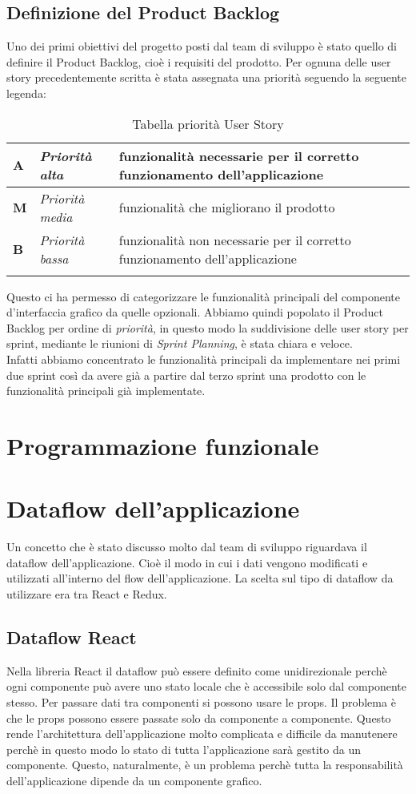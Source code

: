 \subsection{Definizione del Product Backlog}
Uno dei primi obiettivi del progetto posti dal team di sviluppo è stato quello di definire il Product Backlog, cioè i requisiti del prodotto. Per ognuna delle user story precedentemente scritta è stata assegnata una priorità seguendo la seguente legenda:
\begin{longtable} {
		|>{\centering}p{10mm}| 
		|>{}p{25mm}|
		|>{}p{85mm}|
		>{}p{0mm}}
	\hline
	\textbf{A} & \textit{Priorità alta}  & funzionalità necessarie per il corretto funzionamento dell'applicazione \\ \hline
	\textbf{M} & \textit{Priorità media} & funzionalità che migliorano il prodotto \\ \hline
	\textbf{B} & \textit{Priorità bassa} & funzionalità non necessarie per il corretto funzionamento dell'applicazione \\ \hline
	\hline
	\caption{Tabella priorità User Story}
\end{longtable}
\noindent
Questo ci ha permesso di categorizzare le funzionalità principali del componente d'interfaccia grafico da quelle opzionali. Abbiamo quindi popolato il Product Backlog per ordine di \textit{priorità}, in questo modo la suddivisione delle user story per sprint, mediante le riunioni di \textit{Sprint Planning}, è stata chiara e veloce. \\
Infatti abbiamo concentrato le funzionalità principali da implementare nei primi due sprint così da avere già a partire dal terzo sprint una prodotto con le funzionalità principali già implementate.

\section{Programmazione funzionale}

\section{Dataflow dell'applicazione}
Un concetto che è stato discusso molto dal team di sviluppo riguardava il dataflow dell'applicazione. Cioè il modo in cui i dati vengono modificati e utilizzati all'interno del flow dell'applicazione. La scelta sul tipo di dataflow da utilizzare era tra React e Redux.

\subsection{Dataflow React}
Nella libreria React il dataflow può essere definito come unidirezionale perchè ogni componente può avere uno stato locale che è accessibile solo dal componente stesso. Per passare dati tra componenti si possono usare le props. Il problema è che le props possono essere passate solo da componente a componente. Questo rende l'architettura dell'applicazione molto complicata e difficile da manutenere perchè in questo modo lo stato di tutta l'applicazione sarà gestito da un componente.
Questo, naturalmente, è un problema perchè tutta la responsabilità dell'applicazione dipende da un componente grafico.

